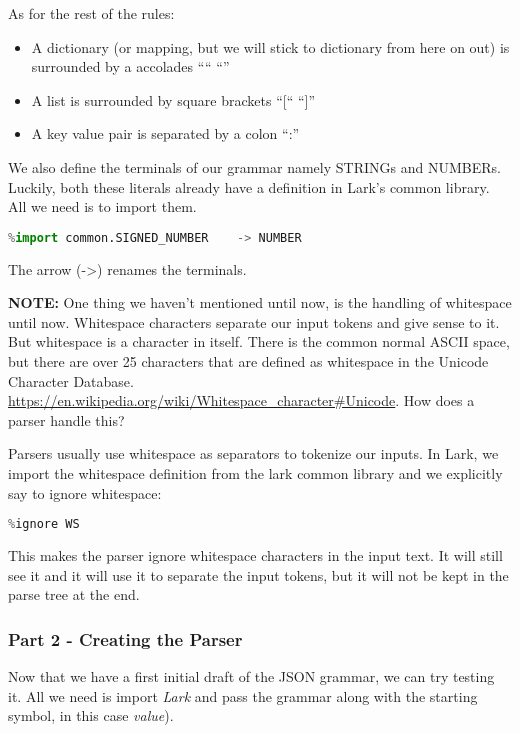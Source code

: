 \documentclass[12pt]{article}
\begin{document}
As for the rest of the rules:
\begin{itemize}
    \item A dictionary (or mapping, but we will stick to dictionary from here on out) is surrounded by a accolades “{“ “}”
    \item A list is surrounded by square brackets “[“ “]”
    \item A key value pair is separated by a colon “:”
\end{itemize}

We also define the terminals of our grammar namely STRINGs and NUMBERs. Luckily, both these literals already have a definition in  Lark’s common library. All we need is to import them.

\begin{lstlisting}[language=Python]
%import common.ESCAPED_STRING   -> STRING
%import common.SIGNED_NUMBER    -> NUMBER
\end{lstlisting}

The arrow (->) renames the terminals. 

\textbf{NOTE:} One thing we haven’t mentioned until now, is the handling of whitespace until now. Whitespace characters separate our input tokens and give sense to it. But whitespace is a character in itself. There is the common normal ASCII space, but there are over 25 characters that are defined as whitespace in the Unicode Character Database. \url{https://en.wikipedia.org/wiki/Whitespace_character#Unicode}. How does a parser handle this? 

Parsers usually use whitespace as separators to tokenize our inputs. In Lark, we import the whitespace definition from the lark common library and we explicitly say to ignore whitespace:

\begin{lstlisting}[language=Python]
%import common.WS
%ignore WS
\end{lstlisting}

This makes the parser ignore whitespace characters in the input text. It will still see it and it will use it to separate the input tokens, but it will not be kept in the parse tree at the end.

\subsubsection{Part 2 - Creating the Parser
}

Now that we have a first initial draft of the JSON grammar, we can try testing it. All we need is import \emph{Lark} and pass the grammar along with the starting symbol, in this case \emph{value}).
\end{document}
